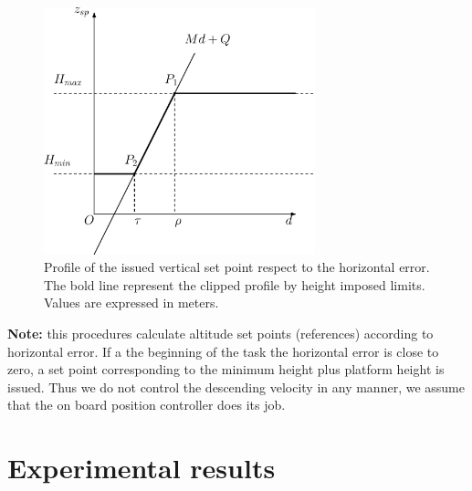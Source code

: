\begin{figure}[h]
 \centering
   \includegraphics[width = 0.7\textwidth ]{profile.eps}
    \caption[Descent profile]{Profile of the issued vertical set point respect to the horizontal error. The bold line represent the clipped profile by height imposed limits. Values are expressed in meters.}
   \label{figure:profile}
\end{figure}

\noindent
\textbf{Note: } this procedures calculate altitude set points (references) according to horizontal error. If a the beginning of the task the horizontal error is close to zero, a set point corresponding to the minimum height plus platform height is issued. Thus we do not control the descending velocity in any manner, we assume that the on board position controller does its job.

\section{Experimental results}

